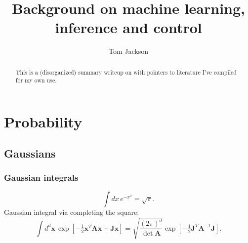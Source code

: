 \documentclass[notitlepage,openany,11pt]{report}
\makeatletter
\theoremstyle{plain}%
\numberwithin{equation}{section}
\newcommand*{\toccontents}{\@starttoc{toc}}
\makeatother
\begin{document}
\newcommand {\be}{\begin{equation*}}
\newcommand {\ee} {\end{equation*}}
\newcommand{\boldref}[1]{\textbf{\ref{#1}}}
\newcommand{\boldnameref}[1]{\textbf{\nameref{#1}}}

\newcommand{\mbf}[1]{\mathbf{#1}}
\newcommand{\mbb}[1]{\mathbb{#1}}
\newcommand{\mcal}[1]{\mathcal{#1}}
\newcommand{\mtilde}[1]{\widetilde{#1}}
\newcommand{\mhat}[1]{\widehat{#1}}
\newcommand{\mol}[1]{\overline{#1}}



\title{Background on machine learning, inference and control}
\author{Tom Jackson}

\hypersetup{pageanchor=false} %

\maketitle

\begin{abstract}
This is a (disorganized) summary writeup on with pointers to literature I've compiled for my own use.\end{abstract}

\hypersetup{pageanchor=true}

\toccontents

\restoregeometry


\chapter{Probability}

\section{Gaussians}

\subsection{Gaussian integrals}
\be
\int \! dx \, e^{-x^{2}} = \sqrt{\pi}.
\ee
Gaussian integral via completing the square:
\be
\int \! d^{d}\mbf{x} \, \exp \left[ - \tfrac{1}{2} \mbf{x}^{T} \mbf{A} \mbf{x} + \mbf{Jx} \right] = \sqrt{\frac{(2 \pi)^{d}}{\det \mbf{A}}} \exp \left[ - \tfrac{1}{2} \mbf{J}^{T} \mbf{A}^{-1} \mbf{J} \right].
\ee
\end{document}
